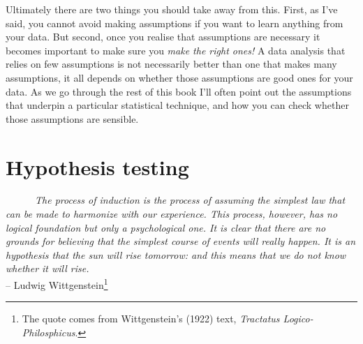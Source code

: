 \documentclass[
]{book}
\begin{document}
Ultimately there are two things you should take away from this. First, as I've said, you cannot avoid making assumptions if you want to learn anything from your data. But second, once you realise that assumptions are necessary it becomes important to make sure you \emph{make the right ones!} A data analysis that relies on few assumptions is not necessarily better than one that makes many assumptions, it all depends on whether those assumptions are good ones for your data. As we go through the rest of this book I'll often point out the assumptions that underpin a particular statistical technique, and how you can check whether those assumptions are sensible.

\hypertarget{hypothesistesting}{%
\chapter{Hypothesis testing}\label{hypothesistesting}}

~~~~~~\emph{The process of induction is the process of assuming the simplest law that can be made to harmonize with our experience. This process, however, has no logical foundation but only a psychological one. It is clear that there are no grounds for believing that the simplest course of events will really happen. It is an hypothesis that the sun will rise tomorrow: and this means that we do not know whether it will rise.}\\
\hspace*{0.333em}\hspace*{0.333em}\hspace*{0.333em}\hspace*{0.333em}\hspace*{0.333em}\hspace*{0.333em}\hspace*{0.333em}\hspace*{0.333em}\hspace*{0.333em}\hspace*{0.333em}\hspace*{0.333em}\hspace*{0.333em}\hspace*{0.333em}\hspace*{0.333em}\hspace*{0.333em}\hspace*{0.333em}\hspace*{0.333em}\hspace*{0.333em}\hspace*{0.333em}\hspace*{0.333em}\hspace*{0.333em}\hspace*{0.333em}\hspace*{0.333em}\hspace*{0.333em}\hspace*{0.333em}\hspace*{0.333em}\hspace*{0.333em}\hspace*{0.333em}\hspace*{0.333em}\hspace*{0.333em}-- Ludwig Wittgenstein\footnote{The quote comes from Wittgenstein's (1922) text, \emph{Tractatus Logico-Philosphicus}.}
\end{document}
